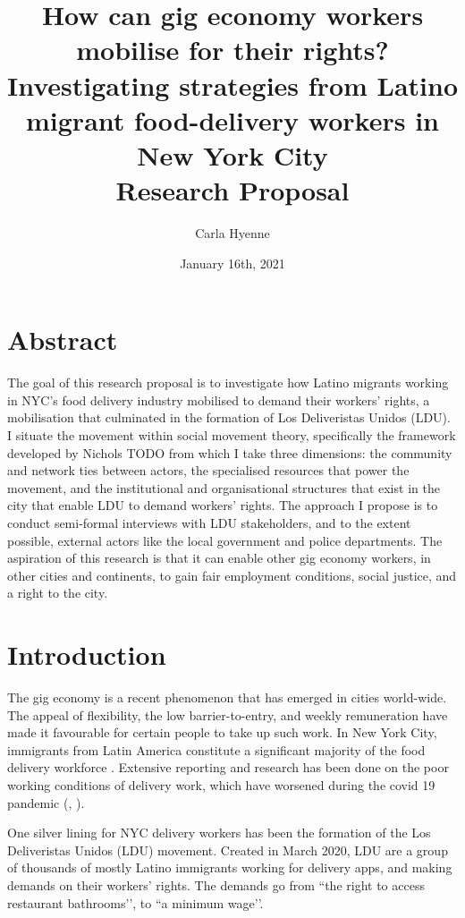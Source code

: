 \documentclass{article}
\title{How can gig economy workers mobilise for their rights? Investigating strategies from Latino migrant food-delivery workers in New York City \\[5ex]Research Proposal \\[3ex]}
\author{Carla Hyenne}
\date{January 16th, 2021}
\begin{document}
\maketitle

\section{Abstract}

The goal of this research proposal is to investigate how Latino migrants working in NYC’s food delivery industry mobilised to demand their workers’ rights, a mobilisation that culminated in the formation of Los Deliveristas Unidos (LDU).
I situate the movement within social movement theory, specifically the framework developed by Nichols TODO from which I take three dimensions: the community and network ties between actors, the specialised resources that power the movement, and the institutional and organisational structures that exist in the city that enable LDU to demand workers' rights.
The approach I propose is to conduct semi-formal interviews with LDU stakeholders, and to the extent possible, external actors like the local government and police departments.
The aspiration of this research is that it can enable other gig economy workers, in other cities and continents, to gain fair employment conditions, social justice, and a right to the city.

\pagebreak

\section{Introduction}

The gig economy is a recent phenomenon that has emerged in cities world-wide. The appeal of flexibility, the low barrier-to-entry, and weekly remuneration have made it favourable for certain people to take up such work. In New York City, immigrants from Latin America constitute a significant majority of the food delivery workforce \parencite{ldu_report2021}. Extensive reporting and research has been done on the poor working conditions of delivery work, which have worsened during the covid 19 pandemic (\cite{newyorker2020uncertain}, \cite{nytimes2021risk}).

One silver lining for NYC delivery workers has been the formation of the Los Deliveristas Unidos (LDU) movement. Created in March 2020, LDU are a group of thousands of mostly Latino immigrants working for delivery apps, and making demands on their workers’ rights. The demands go from ``the right to access restaurant bathrooms’’, to ``a minimum wage’’. 
\end{document}
